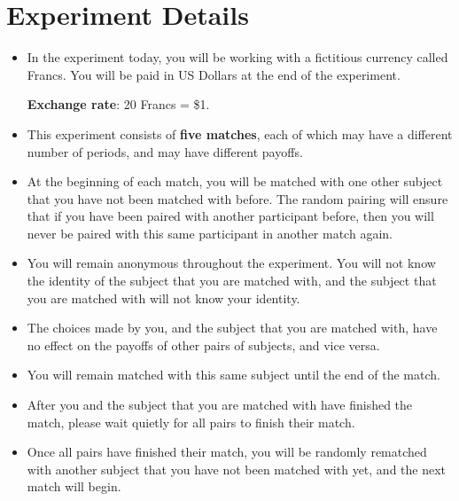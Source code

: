 \documentclass[11pt]{article}
\newcommand{\dblbkt}[1]{}
\begin{document}
\section*{\dblbkt{3} Experiment Details} 
\begin{itemize} 
\item In the experiment today, you will be working with a fictitious currency called Francs. You will be paid in US Dollars at the end of the experiment.
\begin{center} 
\dblbkt{1}{\bf Exchange rate}: 20 Francs = \$1.
\end{center} 

\item  This experiment consists of \dblbkt{1}{\bf five matches}, each of which may have a different number of periods, and may have different payoffs.  
\item At the beginning of each match, \dblbkt{1} you will be matched with one other subject that you have not been matched with before. The random pairing will ensure that if you have been paired with another participant before, then you will never be paired with this same participant in another match again.
\item You will remain \dblbkt{1} anonymous throughout the experiment.  You will not know the identity of the subject that you are matched with, and the subject that you are matched with will not know your identity.  
\item The choices made by you, and the subject that you are matched with, have no effect on the payoffs of other pairs of subjects, and vice versa.
\item You will remain matched with this \dblbkt{1} same subject until the end of the match.  
\item After you and the subject that you are matched with have finished the match, please wait quietly for all pairs to finish their match.  
\item Once all pairs have finished their match, you will be \dblbkt{1} randomly rematched with another subject that you have not been matched with yet, and the next match will begin.  
\end{itemize}
\end{document}
